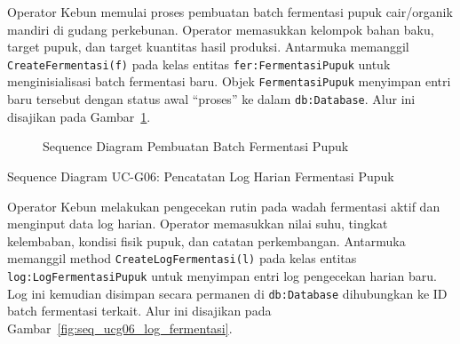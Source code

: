 Operator Kebun memulai proses pembuatan batch fermentasi pupuk cair/organik mandiri di gudang perkebunan. 
Operator memasukkan kelompok bahan baku, target pupuk, dan target kuantitas hasil produksi. 
Antarmuka memanggil \texttt{CreateFermentasi(f)} pada kelas entitas \texttt{fer:FermentasiPupuk} 
untuk menginisialisasi batch fermentasi baru. Objek \texttt{FermentasiPupuk} menyimpan entri baru tersebut 
dengan status awal ``proses'' ke dalam \texttt{db:Database}. Alur ini disajikan pada Gambar~\ref{fig:seq_ucg05_fermentasi}.

\begin{figure}[htbp]
\centering
{}
\caption{Sequence Diagram Pembuatan Batch Fermentasi Pupuk}
\label{fig:seq_ucg05_fermentasi}
\end{figure}

\newpage

\item{Sequence Diagram UC-G06: Pencatatan Log Harian Fermentasi Pupuk}

Operator Kebun melakukan pengecekan rutin pada wadah fermentasi aktif dan menginput data log harian. 
Operator memasukkan nilai suhu, tingkat kelembaban, kondisi fisik pupuk, dan catatan perkembangan. 
Antarmuka memanggil method \texttt{CreateLogFermentasi(l)} pada kelas entitas \texttt{log:LogFermentasiPupuk} 
untuk menyimpan entri log pengecekan harian baru. Log ini kemudian disimpan secara permanen di 
\texttt{db:Database} dihubungkan ke ID batch fermentasi terkait. Alur ini disajikan pada Gambar~\ref{fig:seq_ucg06_log_fermentasi}.

